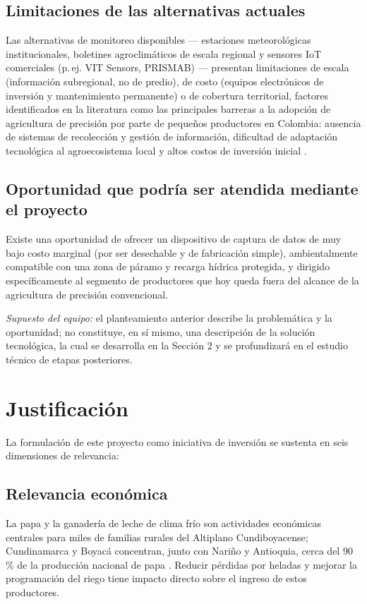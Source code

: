 \documentclass[11pt,a4paper]{article}
\newcommand{\supuesto}[1]{\textit{Supuesto del equipo: #1}}
\begin{document}
\subsection{Limitaciones de las alternativas actuales}
Las alternativas de monitoreo disponibles --- estaciones meteorológicas institucionales, boletines agroclimáticos de escala regional y sensores IoT comerciales (p.\,ej. VIT Sensors, PRISMAB) --- presentan limitaciones de escala (información subregional, no de predio), de costo (equipos electrónicos de inversión y mantenimiento permanente) o de cobertura territorial, factores identificados en la literatura como las principales barreras a la adopción de agricultura de precisión por parte de pequeños productores en Colombia: ausencia de sistemas de recolección y gestión de información, dificultad de adaptación tecnológica al agroecosistema local y altos costos de inversión inicial \citep{scielo2022precision}.

\subsection{Oportunidad que podría ser atendida mediante el proyecto}
Existe una oportunidad de ofrecer un dispositivo de captura de datos de muy bajo costo marginal (por ser desechable y de fabricación simple), ambientalmente compatible con una zona de páramo y recarga hídrica protegida, y dirigido específicamente al segmento de productores que hoy queda fuera del alcance de la agricultura de precisión convencional.

\medskip
\noindent\supuesto{} el planteamiento anterior describe la problemática y la oportunidad; no constituye, en sí mismo, una descripción de la solución tecnológica, la cual se desarrolla en la Sección 2 y se profundizará en el estudio técnico de etapas posteriores.

\section{Justificación}

La formulación de este proyecto como iniciativa de inversión se sustenta en seis dimensiones de relevancia:

\subsection{Relevancia económica}
La papa y la ganadería de leche de clima frío son actividades económicas centrales para miles de familias rurales del Altiplano Cundiboyacense; Cundinamarca y Boyacá concentran, junto con Nariño y Antioquia, cerca del 90\,\% de la producción nacional de papa \citep{agronet_papa}. Reducir pérdidas por heladas y mejorar la programación del riego tiene impacto directo sobre el ingreso de estos productores.
\end{document}
